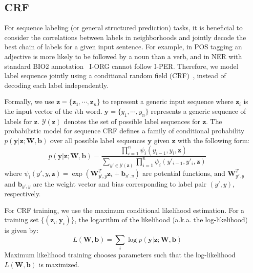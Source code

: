 \documentclass[11pt]{article}
\begin{document}
\subsection{CRF}
For sequence labeling (or general structured prediction) tasks, it is beneficial to consider the correlations between labels in neighborhoods and jointly decode the best chain of labels for a given input sentence. For example, in POS tagging an adjective is more likely to be followed by a noun than a verb, and in NER with standard \textsf{BIO2} annotation~\cite{tksveenstra99eacl} \mbox{\textup{I-ORG}} cannot follow \textup{I-PER}. Therefore, we model label sequence jointly using a conditional random field (CRF)~\cite{lafferty2001}, instead of decoding each label independently.

Formally, we use $\mathbf{z} = \{\mathbf{z}_1, \cdots, \mathbf{z}_n\}$ to represent a generic input sequence where $\mathbf{z}_i$ is the input vector of the $i$th word. 
$\boldsymbol{y} = \{y_1, \cdots, y_n\}$ represents a generic sequence of labels for $\mathbf{z}$.
$\mathcal{Y}(\mathbf{z})$ denotes the set of possible label sequences for $\mathbf{z}$.
The probabilistic model for sequence CRF defines a family of conditional probability $p(\boldsymbol{y}|\mathbf{z};\mathbf{W}, \mathbf{b})$ over all possible label sequences $\boldsymbol{y}$ given $\mathbf{z}$ with the following form:
\begin{displaymath}
p(\boldsymbol{y}|\mathbf{z};\mathbf{W},\mathbf{b}) = \frac{\prod\limits_{i=1}^{n} \psi_i(y_{i-1}, y_i, \mathbf{z})}{\sum\limits_{y' \in \mathcal{Y}(\mathbf{z})} \prod\limits_{i=1}^{n} \psi_i(y'_{i-1}, y'_i, \mathbf{z})}
\end{displaymath}
where $\psi_i(y', y, \mathbf{z}) = \exp(\mathbf{W}_{y',y}^{T} \mathbf{z}_i + \mathbf{b}_{y',y})$ are potential functions, and $\mathbf{W}_{y',y}^{T}$ and $\mathbf{b}_{y',y}$ are the weight vector and bias corresponding to label pair $(y', y)$, respectively.

For CRF training, we use the maximum conditional likelihood estimation. For a training set 
$\{(\mathbf{z}_i, \boldsymbol{y}_i)\}$, the logarithm of the likelihood (a.k.a. the log-likelihood) 
is given by:
\begin{displaymath}
L(\mathbf{W}, \mathbf{b}) = \sum\limits_i \log p(\boldsymbol{y}|\mathbf{z};\mathbf{W}, \mathbf{b})
\end{displaymath}
Maximum likelihood training chooses parameters such that the log-likelihood $L(\mathbf{W}, \mathbf{b})$ is maximized.
\end{document}
